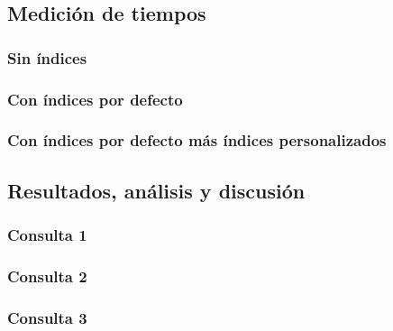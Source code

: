 \subsection{Medición de tiempos}
\subsubsection{Sin índices}

\subsubsection{Con índices por defecto}

\subsubsection{Con índices por defecto más índices personalizados}

\subsection{Resultados, análisis y discusión}
\subsubsection{Consulta 1}
\subsubsection{Consulta 2}
\subsubsection{Consulta 3}
